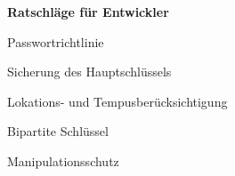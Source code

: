 \begin{frame}
	\centering
	\textbf{Ratschläge für Entwickler}
	\begin{block}{}
		Passwortrichtlinie
	\end{block}
	\begin{block}{}
		Sicherung des Hauptschlüssels
	\end{block}
	\begin{block}{}
		Lokations- und Tempusberücksichtigung
	\end{block}
	\begin{block}{}
		Bipartite Schlüssel
	\end{block}
	\begin{block}{}
		Manipulationsschutz
	\end{block}
    
\end{frame}